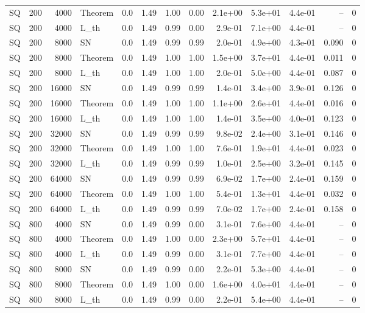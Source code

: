\begin{tabular}{lrrlrrrrrrrrr}
SQ & 200 & 4000 & Theorem & 0.0 & 1.49 & 1.00 & 0.00 & 2.1e+00 & 5.3e+01 & 4.4e-01 & -- & 0 \\
SQ & 200 & 4000 & L\_th & 0.0 & 1.49 & 0.99 & 0.00 & 2.9e-01 & 7.1e+00 & 4.4e-01 & -- & 0 \\
SQ & 200 & 8000 & SN & 0.0 & 1.49 & 0.99 & 0.99 & 2.0e-01 & 4.9e+00 & 4.3e-01 & 0.090 & 0 \\
SQ & 200 & 8000 & Theorem & 0.0 & 1.49 & 1.00 & 1.00 & 1.5e+00 & 3.7e+01 & 4.4e-01 & 0.011 & 0 \\
SQ & 200 & 8000 & L\_th & 0.0 & 1.49 & 1.00 & 1.00 & 2.0e-01 & 5.0e+00 & 4.4e-01 & 0.087 & 0 \\
SQ & 200 & 16000 & SN & 0.0 & 1.49 & 0.99 & 0.99 & 1.4e-01 & 3.4e+00 & 3.9e-01 & 0.126 & 0 \\
SQ & 200 & 16000 & Theorem & 0.0 & 1.49 & 1.00 & 1.00 & 1.1e+00 & 2.6e+01 & 4.4e-01 & 0.016 & 0 \\
SQ & 200 & 16000 & L\_th & 0.0 & 1.49 & 1.00 & 1.00 & 1.4e-01 & 3.5e+00 & 4.0e-01 & 0.123 & 0 \\
SQ & 200 & 32000 & SN & 0.0 & 1.49 & 0.99 & 0.99 & 9.8e-02 & 2.4e+00 & 3.1e-01 & 0.146 & 0 \\
SQ & 200 & 32000 & Theorem & 0.0 & 1.49 & 1.00 & 1.00 & 7.6e-01 & 1.9e+01 & 4.4e-01 & 0.023 & 0 \\
SQ & 200 & 32000 & L\_th & 0.0 & 1.49 & 0.99 & 0.99 & 1.0e-01 & 2.5e+00 & 3.2e-01 & 0.145 & 0 \\
SQ & 200 & 64000 & SN & 0.0 & 1.49 & 0.99 & 0.99 & 6.9e-02 & 1.7e+00 & 2.4e-01 & 0.159 & 0 \\
SQ & 200 & 64000 & Theorem & 0.0 & 1.49 & 1.00 & 1.00 & 5.4e-01 & 1.3e+01 & 4.4e-01 & 0.032 & 0 \\
SQ & 200 & 64000 & L\_th & 0.0 & 1.49 & 0.99 & 0.99 & 7.0e-02 & 1.7e+00 & 2.4e-01 & 0.158 & 0 \\
SQ & 800 & 4000 & SN & 0.0 & 1.49 & 0.99 & 0.00 & 3.1e-01 & 7.6e+00 & 4.4e-01 & -- & 0 \\
SQ & 800 & 4000 & Theorem & 0.0 & 1.49 & 1.00 & 0.00 & 2.3e+00 & 5.7e+01 & 4.4e-01 & -- & 0 \\
SQ & 800 & 4000 & L\_th & 0.0 & 1.49 & 0.99 & 0.00 & 3.1e-01 & 7.7e+00 & 4.4e-01 & -- & 0 \\
SQ & 800 & 8000 & SN & 0.0 & 1.49 & 0.99 & 0.00 & 2.2e-01 & 5.3e+00 & 4.4e-01 & -- & 0 \\
SQ & 800 & 8000 & Theorem & 0.0 & 1.49 & 1.00 & 0.00 & 1.6e+00 & 4.0e+01 & 4.4e-01 & -- & 0 \\
SQ & 800 & 8000 & L\_th & 0.0 & 1.49 & 0.99 & 0.00 & 2.2e-01 & 5.4e+00 & 4.4e-01 & -- & 0 \\

\end{tabular}
